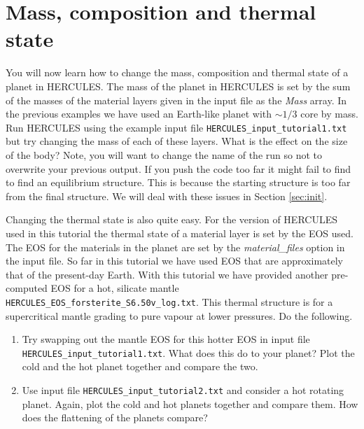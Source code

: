 \documentclass[11pt, oneside]{article}   	%
\begin{document}
\section{Mass, composition and thermal state}

You will now learn how to change the mass, composition and thermal state of a planet in HERCULES. The mass of the planet in HERCULES is set by the sum of the masses of the material layers given in the input file as the {\it Mass} array. In the previous examples we have used an Earth-like planet with $\sim1/3$ core by mass. Run HERCULES using the example input file \texttt{HERCULES\_input\_tutorial1.txt} but try changing the mass of each of these layers. What is the effect on the size of the body? Note, you will want to change the name of the run so not to overwrite your previous output. If you push the code too far it might fail to find to find an equilibrium structure. This is because the starting structure is too far from the final structure. We will deal with these issues in Section \ref{sec:init}.

Changing the thermal state is also quite easy. For the version of HERCULES used in this tutorial the thermal state of a material layer is set by the EOS used. The EOS for the materials in the planet are set by the {\it material\_files} option in the input file. So far in this tutorial we have used EOS that are approximately that of the present-day Earth. With this tutorial we have provided another pre-computed EOS for a hot, silicate mantle \texttt{HERCULES\_EOS\_forsterite\_S6.50v\_log.txt}. This thermal structure is for a supercritical mantle grading to pure vapour at lower pressures. Do the following.

\begin{enumerate}

\item Try swapping out the mantle EOS for this hotter EOS in input file \texttt{HERCULES\_input\_tutorial1.txt}. What does this do to your planet? Plot the cold and the hot planet together and compare the two.

\item Use input file \texttt{HERCULES\_input\_tutorial2.txt} and consider a hot rotating planet. Again, plot the cold and hot  planets together and compare them. How does the flattening of the planets compare?

\end{enumerate}
\end{document}

